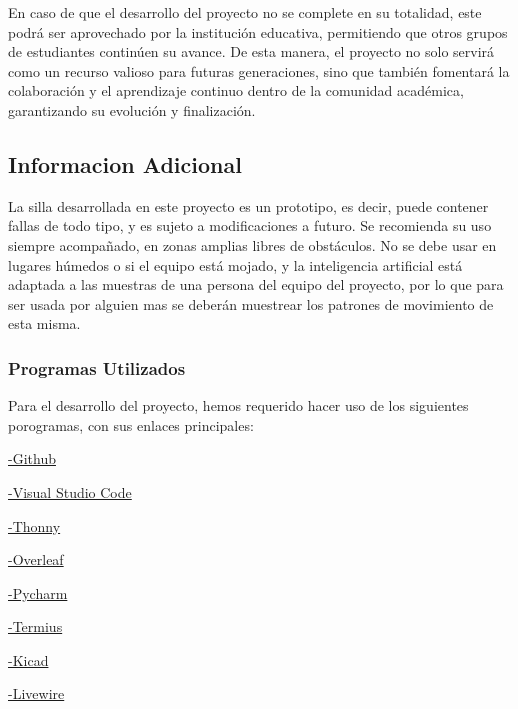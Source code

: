 \documentclass{article}
\begin{document}
En caso de que el desarrollo del proyecto no se complete en su totalidad, este podrá ser aprovechado por la institución educativa, permitiendo que otros grupos de estudiantes continúen su avance. De esta manera, el proyecto no solo servirá como un recurso valioso para futuras generaciones, sino que también fomentará la colaboración y el aprendizaje continuo dentro de la comunidad académica, garantizando su evolución y finalización.
\subsection {Informacion Adicional}
La silla desarrollada en este proyecto es un prototipo, es decir, puede contener fallas de todo tipo, y es sujeto a modificaciones a futuro. Se recomienda su uso siempre acompañado, en zonas amplias libres de obstáculos. No se debe usar en lugares húmedos o si el equipo está mojado, y la inteligencia artificial está adaptada a las muestras de una persona del equipo del proyecto, por lo que para ser usada por alguien mas se deberán muestrear los patrones de movimiento de esta misma.

\subsubsection{Programas Utilizados}
Para el desarrollo del proyecto, hemos requerido hacer uso de los siguientes porogramas, con sus enlaces principales: \newline


    \href{https://github.com/}{-Github}    
    \newline

    \href{https://code.visualstudio.com/}{-Visual Studio Code}
    \newline

    \href{https://thonny.org/}{-Thonny}
    \newline

    \href{https://es.overleaf.com/project}{-Overleaf}
    \newline

    \href{https://www.jetbrains.com/es-es/pycharm/}{-Pycharm}
    \newline

    \href{https://termius.com/}{-Termius}
    \newline

    \href{https://www.kicad.org/}{-Kicad}
    \newline

    \href{https://livewire.laravel.com/}{-Livewire}
    \newline
\end{document}
